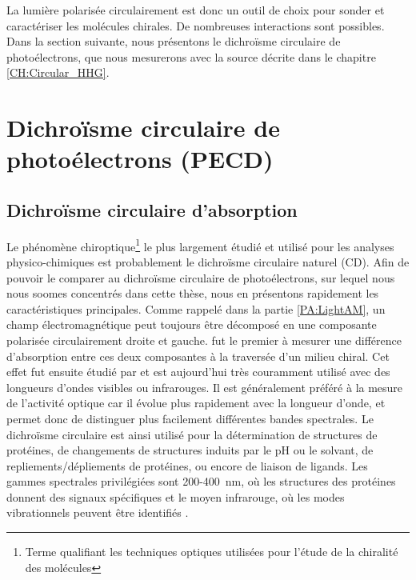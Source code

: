 La lumière polarisée circulairement est donc un outil de choix pour sonder et caractériser les molécules chirales. De nombreuses interactions sont possibles. Dans la section suivante, nous présentons le dichroïsme circulaire de photoélectrons, que nous mesurerons avec la source décrite dans le chapitre \ref{CH:Circular_HHG}.


\section{Dichroïsme circulaire de photoélectrons (PECD)}
\label{sec:PECD}
\subsection{Dichroïsme circulaire d'absorption}
Le phénomène chiroptique\footnote{Terme qualifiant les techniques optiques utilisées pour l'étude de la chiralité des molécules} le plus largement étudié et utilisé pour les analyses physico-chimiques est probablement le dichroïsme circulaire naturel (CD). Afin de pouvoir le comparer au dichroïsme circulaire de photoélectrons, sur lequel nous nous soomes concentrés dans cette thèse, nous en présentons rapidement les caractéristiques principales. Comme rappelé dans la partie \ref{PA:LightAM}, un champ électromagnétique peut toujours être décomposé en une composante polarisée circulairement droite et gauche.  fut le premier à mesurer une différence d'absorption entre ces deux composantes à la traversée d'un milieu chiral. Cet effet fut ensuite étudié par  et est aujourd'hui très couramment utilisé avec des longueurs d'ondes visibles ou infrarouges. Il est généralement préféré à la mesure de l'activité optique car il évolue plus rapidement avec la longueur d'onde, et permet donc de distinguer plus facilement différentes bandes spectrales. Le dichroïsme circulaire est ainsi utilisé pour la détermination de structures de protéines, de changements de structures induits par le pH ou le solvant, de repliements/dépliements de protéines, ou encore de liaison de ligands. Les gammes spectrales privilégiées sont 200-400~nm, où les structures des protéines donnent des signaux spécifiques  et le moyen infrarouge, où les modes vibrationnels peuvent être identifiés .

